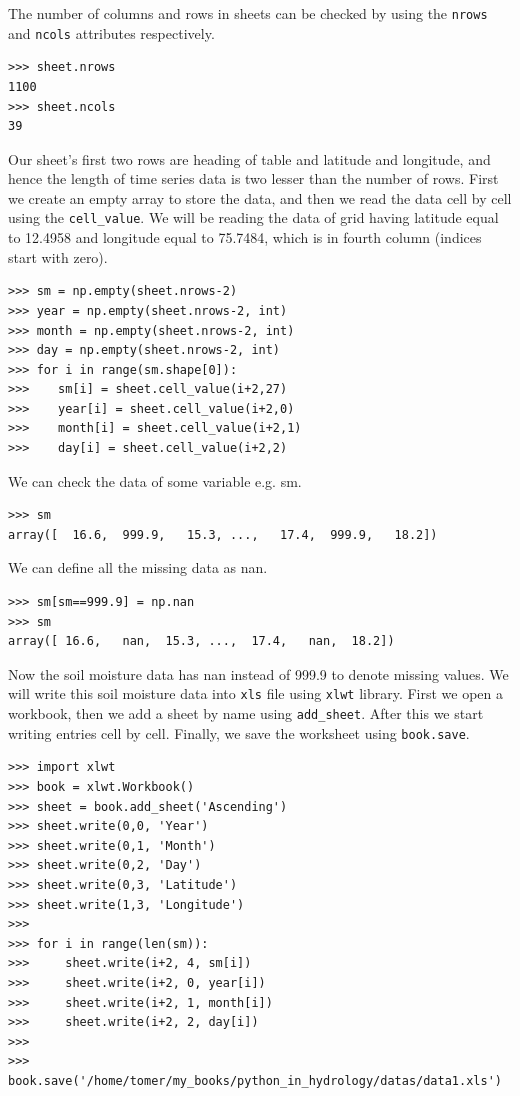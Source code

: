 \documentclass[10pt]{book}
\begin{document}
The number of columns and rows in sheets can be checked by using the \verb"nrows" and \verb"ncols" attributes respectively. 
\beforeverb \begin{verbatim}
>>> sheet.nrows
1100
>>> sheet.ncols
39
\end{verbatim} \afterverb
Our sheet's first two rows are heading of table and latitude and longitude, and hence the length of time series data is two lesser than the number of rows. First we create an empty array to store the data, and then we read the data cell by cell using the \verb"cell_value". We will be reading the data of grid having latitude equal to 12.4958 and longitude equal to 75.7484, which is in fourth column (indices start with zero). 
\beforeverb \begin{verbatim}
>>> sm = np.empty(sheet.nrows-2)
>>> year = np.empty(sheet.nrows-2, int)
>>> month = np.empty(sheet.nrows-2, int)
>>> day = np.empty(sheet.nrows-2, int)
>>> for i in range(sm.shape[0]): 
>>>    sm[i] = sheet.cell_value(i+2,27)  
>>>    year[i] = sheet.cell_value(i+2,0)
>>>    month[i] = sheet.cell_value(i+2,1)
>>>    day[i] = sheet.cell_value(i+2,2)
\end{verbatim} \afterverb
We can check the data of some variable e.g. sm.
\beforeverb \begin{verbatim}
>>> sm
array([  16.6,  999.9,   15.3, ...,   17.4,  999.9,   18.2])
\end{verbatim} \afterverb
We can define all the missing data as nan. 
\beforeverb \begin{verbatim}
>>> sm[sm==999.9] = np.nan
>>> sm
array([ 16.6,   nan,  15.3, ...,  17.4,   nan,  18.2])
\end{verbatim} \afterverb
Now the soil moisture data has nan instead of 999.9 to denote missing values. We will write this soil moisture data into \verb"xls" file using \verb"xlwt" library. First we open a workbook, then we add a sheet by name using \verb"add_sheet". After this we start writing entries cell by cell. Finally, we save the worksheet using \verb"book.save". 

\beforeverb \begin{verbatim}
>>> import xlwt
>>> book = xlwt.Workbook()
>>> sheet = book.add_sheet('Ascending')
>>> sheet.write(0,0, 'Year')
>>> sheet.write(0,1, 'Month')
>>> sheet.write(0,2, 'Day')
>>> sheet.write(0,3, 'Latitude')
>>> sheet.write(1,3, 'Longitude')
>>> 
>>> for i in range(len(sm)):
>>>     sheet.write(i+2, 4, sm[i])
>>>     sheet.write(i+2, 0, year[i])
>>>     sheet.write(i+2, 1, month[i])
>>>     sheet.write(i+2, 2, day[i])
>>>     
>>> book.save('/home/tomer/my_books/python_in_hydrology/datas/data1.xls')
\end{verbatim} \afterverb
\end{document}
